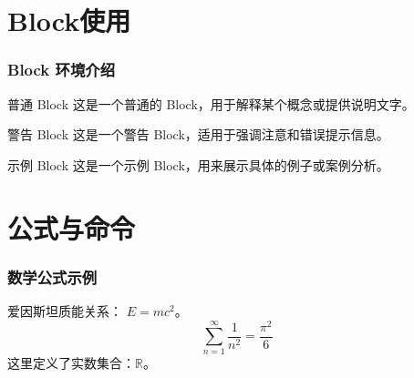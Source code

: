 \documentclass[10pt,aspectratio=169,mathserif]{beamer}
\begin{document}
\section{Block使用}
\begin{frame}
    \frametitle{Block 环境介绍}
    \begin{block}{普通 Block}
        这是一个普通的 Block，用于解释某个概念或提供说明文字。
    \end{block}
    
    \begin{alertblock}{警告 Block}
        这是一个警告 Block，适用于强调注意和错误提示信息。
    \end{alertblock}
    
    \begin{exampleblock}{示例 Block}
        这是一个示例 Block，用来展示具体的例子或案例分析。
    \end{exampleblock}
\end{frame}

\section{公式与命令}
\begin{frame}
    \frametitle{数学公式示例}
    爱因斯坦质能关系： $E = mc^2$。
    \[
    \sum_{n=1}^{\infty} \frac{1}{n^2} = \frac{\pi^2}{6}
    \]
    \newcommand{\Real}{\mathbb{R}}
    这里定义了实数集合：$\Real$。
\end{frame}

\end{document}
